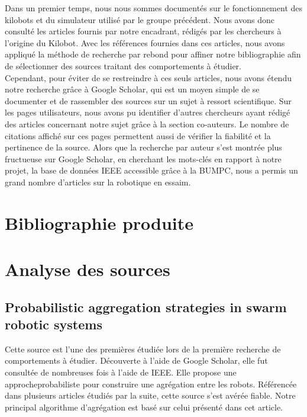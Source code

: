 \documentclass[a4paper]{article}
\begin{document}
Dans un premier temps, nous nous sommes documentés sur le fonctionnement des kilobots et du simulateur utilisé par le groupe précédent. Nous avons donc consulté les articles fournis par notre encadrant, rédigés par les chercheurs à l'origine du Kilobot.
Avec les références fournies dans ces articles, nous avons appliqué la méthode de recherche par rebond pour affiner notre bibliographie afin de sélectionner des sources traitant des comportements à étudier. \\ Cependant, pour éviter de se restreindre à ces seuls articles, nous avons étendu notre recherche grâce à Google Scholar, qui est un moyen simple de se documenter et de rassembler des sources sur un sujet à ressort scientifique. Sur les pages utilisateurs, nous avons pu identifier d'autres chercheurs ayant rédigé des articles concernant notre sujet grâce à la section co-auteurs. Le nombre de citations affiché sur ces pages permettent aussi de vérifier la fiabilité et la pertinence de la source. Alors que la recherche par auteur s'est montrée plus fructueuse sur Google Scholar, en cherchant les mots-clés en rapport à notre projet, la base de données IEEE accessible grâce à la BUMPC, nous a permis un grand nombre d'articles sur la robotique en essaim.

\section{Bibliographie produite}

\printbibliography

\section{Analyse des sources}

\subsection{Probabilistic aggregation strategies in swarm robotic systems}

Cette source est l’une des premières étudiée lors de la première recherche de comportements à étudier. Découverte à l’aide de Google Scholar, elle fut consultée de nombreuses fois à l’aide de IEEE. Elle propose une approcheprobabiliste pour construire une agrégation entre les robots. Référencée dans plusieurs articles
étudiés par la suite, cette source s’est avérée fiable. Notre principal algorithme d’agrégation est
basé sur celui présenté dans cet article.
\end{document}
